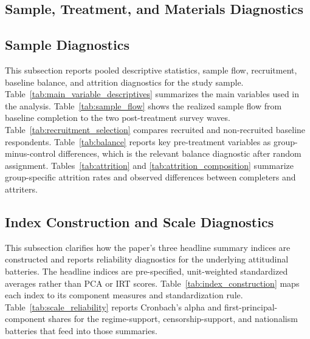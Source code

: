 \documentclass[12pt,american]{article}
\begin{document}
\begin{refsection}


		\section{Sample, Treatment, and Materials Diagnostics}
		\label{app:sample_treatment_material_diagnostics}

		\subsection{Sample Diagnostics}

This subsection reports pooled descriptive statistics, sample flow, recruitment, baseline balance, and attrition diagnostics for the study sample. Table~\ref{tab:main_variable_descriptives} summarizes the main variables used in the analysis. Table~\ref{tab:sample_flow} shows the realized sample flow from baseline completion to the two post-treatment survey waves. Table~\ref{tab:recruitment_selection} compares recruited and non-recruited baseline respondents. Table~\ref{tab:balance} reports key pre-treatment variables as group-minus-control differences, which is the relevant balance diagnostic after random assignment. Tables~\ref{tab:attrition} and \ref{tab:attrition_composition} summarize group-specific attrition rates and observed differences between completers and attriters.













		\subsection{Index Construction and Scale Diagnostics}

This subsection clarifies how the paper's three headline summary indices are constructed and reports reliability diagnostics for the underlying attitudinal batteries. The headline indices are pre-specified, unit-weighted standardized averages rather than PCA or IRT scores. Table~\ref{tab:index_construction} maps each index to its component measures and standardization rule. Table~\ref{tab:scale_reliability} reports Cronbach's alpha and first-principal-component shares for the regime-support, censorship-support, and nationalism batteries that feed into those summaries.


\end{refsection}
\end{document}
